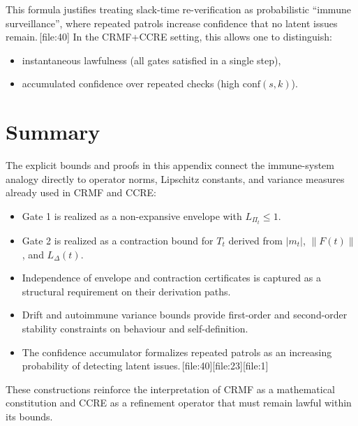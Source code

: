 \documentclass[11pt]{article}
\begin{document}
This formula justifies treating slack-time re-verification as probabilistic “immune surveillance”, where repeated patrols increase confidence that no latent issues remain.\,[file:40]
In the CRMF+CCRE setting, this allows one to distinguish:
\begin{itemize}
  \item instantaneous lawfulness (all gates satisfied in a single step),
  \item accumulated confidence over repeated checks (high \(\mathrm{conf}(s,k)\)).
\end{itemize}

\section{Summary}

The explicit bounds and proofs in this appendix connect the immune-system analogy directly to operator norms, Lipschitz constants, and variance measures already used in CRMF and CCRE:
\begin{itemize}
  \item Gate 1 is realized as a non-expansive envelope with \(L_{\Pi_t}\le 1\).
  \item Gate 2 is realized as a contraction bound for \(T_t\) derived from \(|m_t|\), \(\|F(t)\|\), and \(L_\Delta(t)\).
  \item Independence of envelope and contraction certificates is captured as a structural requirement on their derivation paths.
  \item Drift and autoimmune variance bounds provide first-order and second-order stability constraints on behaviour and self-definition.
  \item The confidence accumulator formalizes repeated patrols as an increasing probability of detecting latent issues.\,[file:40][file:23][file:1]
\end{itemize}
These constructions reinforce the interpretation of CRMF as a mathematical constitution and CCRE as a refinement operator that must remain lawful within its bounds.

\nocite{*}
  
  
\end{document}
